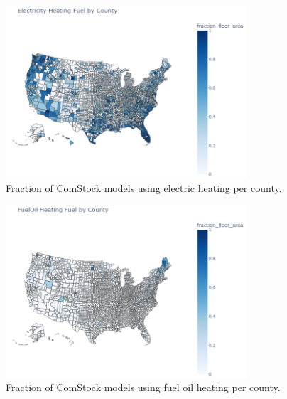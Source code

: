 \begin{figure}
  \centering
  \includegraphics[width=0.8\textwidth]{figures/map_electricity.png}
  \caption[Fraction of ComStock models using electric heating/water heating per county]{Fraction of ComStock models using electric heating per county.}
  \label{fig:map_electricity}
\end{figure}

\begin{figure}
  \centering
  \includegraphics[width=0.8\textwidth]{figures/map_fueloil.png}
  \caption[Fraction of ComStock models using fuel oil heating/water heating per county]{Fraction of ComStock models using fuel oil heating per county.}
  \label{fig:map_fueloil}
\end{figure}

